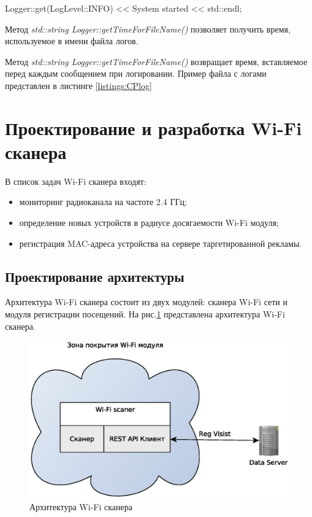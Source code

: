 Logger::get(LogLevel::INFO) << System started << std::endl;

Метод \textit{std::string Logger::getTimeForFileName()} позволяет получить время, используемое в имени файла логов.

Метод \textit{std::string Logger::getTimeForFileName()} возвращает время, вставляемое перед каждым сообщением при логировании. Пример файла с логами представлен в листинге \ref{listings:CPlog}

\section{Проектирование и разработка Wi-Fi сканера}

В список задач Wi-Fi сканера входят:

\begin{itemize}
	\item мониторинг радиоканала на частоте 2.4 ГГц;
	\item определение новых устройств в радиусе досягаемости Wi-Fi модуля;
	\item регистрация MAC-адреса устройства на сервере таргетированной рекламы.
\end{itemize}

\subsection{Проектирование архитектуры}

Архитектура Wi-Fi сканера состоит из двух модулей: сканера Wi-Fi сети и модуля регистрации посещений. На рис.\ref{fig:WiFiScanerArch} представлена архитектура Wi-Fi сканера.

\begin{figure}[H]
	\centering
	\includegraphics[width=\linewidth]{fig/WiFiScanerArch}
	\caption{Архитектура Wi-Fi сканера}
	\label{fig:WiFiScanerArch}
\end{figure}

